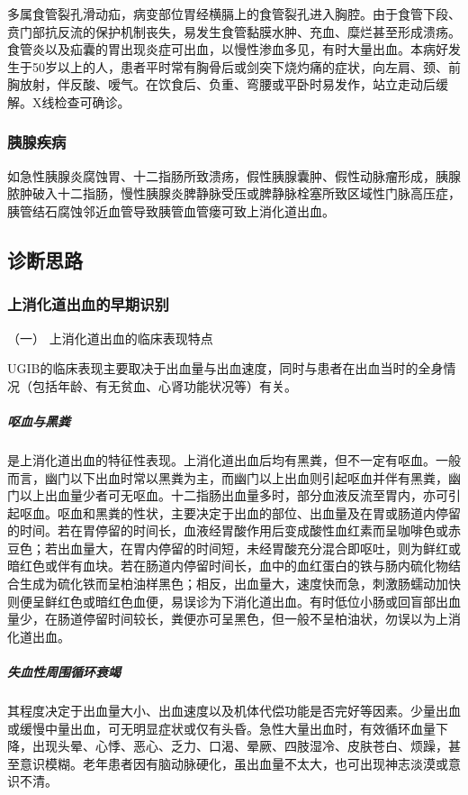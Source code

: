 多属食管裂孔滑动疝，病变部位胃经横膈上的食管裂孔进入胸腔。由于食管下段、贲门部抗反流的保护机制丧失，易发生食管黏膜水肿、充血、糜烂甚至形成溃疡。食管炎以及疝囊的胃出现炎症可出血，以慢性渗血多见，有时大量出血。本病好发生于50岁以上的人，患者平时常有胸骨后或剑突下烧灼痛的症状，向左肩、颈、前胸放射，伴反酸、嗳气。在饮食后、负重、弯腰或平卧时易发作，站立走动后缓解。X线检查可确诊。

\subsubsection{胰腺疾病}

如急性胰腺炎腐蚀胃、十二指肠所致溃疡，假性胰腺囊肿、假性动脉瘤形成，胰腺脓肿破入十二指肠，慢性胰腺炎脾静脉受压或脾静脉栓塞所致区域性门脉高压症，胰管结石腐蚀邻近血管导致胰管血管瘘可致上消化道出血。

\subsection{诊断思路}

\subsubsection{上消化道出血的早期识别}

\hypertarget{text00032.htmlux5cux23CHP1-13-1-4-1-1}{}
（一） 上消化道出血的临床表现特点

UGIB的临床表现主要取决于出血量与出血速度，同时与患者在出血当时的全身情况（包括年龄、有无贫血、心肾功能状况等）有关。

\subparagraph{呕血与黑粪}

是上消化道出血的特征性表现。上消化道出血后均有黑粪，但不一定有呕血。一般而言，幽门以下出血时常以黑粪为主，而幽门以上出血则引起呕血并伴有黑粪，幽门以上出血量少者可无呕血。十二指肠出血量多时，部分血液反流至胃内，亦可引起呕血。呕血和黑粪的性状，主要决定于出血的部位、出血量及在胃或肠道内停留的时间。若在胃停留的时间长，血液经胃酸作用后变成酸性血红素而呈咖啡色或赤豆色；若出血量大，在胃内停留的时间短，未经胃酸充分混合即呕吐，则为鲜红或暗红色或伴有血块。若在肠道内停留时间长，血中的血红蛋白的铁与肠内硫化物结合生成为硫化铁而呈柏油样黑色；相反，出血量大，速度快而急，刺激肠蠕动加快则便呈鲜红色或暗红色血便，易误诊为下消化道出血。有时低位小肠或回盲部出血量少，在肠道停留时间较长，粪便亦可呈黑色，但一般不呈柏油状，勿误以为上消化道出血。

\subparagraph{失血性周围循环衰竭}

其程度决定于出血量大小、出血速度以及机体代偿功能是否完好等因素。少量出血或缓慢中量出血，可无明显症状或仅有头昏。急性大量出血时，有效循环血量下降，出现头晕、心悸、恶心、乏力、口渴、晕厥、四肢湿冷、皮肤苍白、烦躁，甚至意识模糊。老年患者因有脑动脉硬化，虽出血量不太大，也可出现神志淡漠或意识不清。

